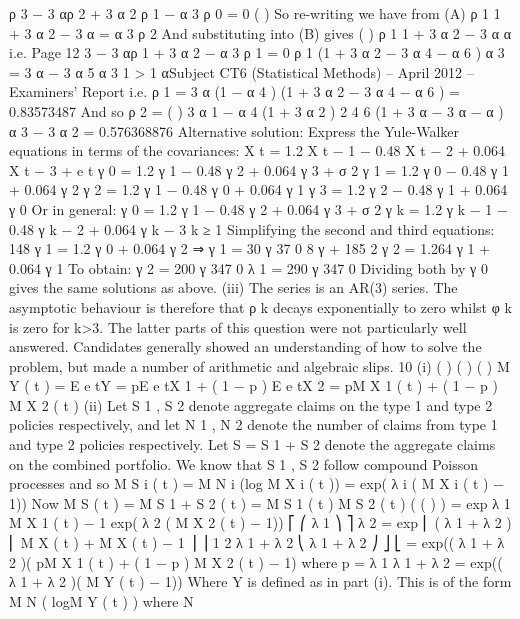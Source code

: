 \documentclass[a4paper,12pt]{article}
\begin{document}
ρ 3 − 3 αρ 2 + 3 α 2 ρ 1 − α 3 ρ 0 = 0
(
)
So re-writing we have from (A) ρ 1 1 + 3 α 2 − 3 α = α 3 ρ 2
And substituting into (B) gives
(
)
ρ 1 1 + 3 α 2 − 3 α
α
i.e.
Page 12
3
− 3 αρ 1 + 3 α 2 − α 3 ρ 1 = 0
ρ 1 (1 + 3 α 2 − 3 α 4 − α 6 )
α 3
=
3 α − 3 α 5
α 3
1
> 1
αSubject CT6 (Statistical Methods) – April 2012 – Examiners’ Report
i.e.
ρ 1 =
3 α (1 − α 4 )
(1 + 3 α 2 − 3 α 4 − α 6 )
= 0.83573487
And so
ρ 2 =
(
)
3 α 1 − α 4 (1 + 3 α 2 )
2
4
6
(1 + 3 α − 3 α − α ) α
3
−
3
α 2
= 0.576368876
Alternative solution:
Express the Yule-Walker equations in terms of the covariances:
X t = 1.2 X t − 1 − 0.48 X t − 2 + 0.064 X t − 3 + e t
γ 0 = 1.2 γ 1 − 0.48 γ 2 + 0.064 γ 3 + σ 2
γ 1 = 1.2 γ 0 − 0.48 γ 1 + 0.064 γ 2
γ 2 = 1.2 γ 1 − 0.48 γ 0 + 0.064 γ 1
γ 3 = 1.2 γ 2 − 0.48 γ 1 + 0.064 γ 0
Or in general:
γ 0 = 1.2 γ 1 − 0.48 γ 2 + 0.064 γ 3 + σ 2
γ k = 1.2 γ k − 1 − 0.48 γ k − 2 + 0.064 γ k − 3 k ≥ 1
Simplifying the second and third equations:
148 γ 1 = 1.2 γ 0 + 0.064 γ 2 ⇒ γ 1 =
30 γ
37 0
8 γ
+ 185
2
γ 2 = 1.264 γ 1 + 0.064 γ 1
To obtain:
γ 2 =
200 γ
347 0
λ 1 =
290 γ
347 0
Dividing both by γ 0 gives the same solutions as above.
(iii)
The series is an AR(3) series. The asymptotic behaviour is therefore that ρ k
decays exponentially to zero
whilst φ k is zero for k>3.
The latter parts of this question were not particularly well answered. Candidates generally
showed an understanding of how to solve the problem, but made a number of arithmetic and
algebraic slips.
\newpage
10
(i)
( )
( )
( )
M Y ( t ) = E e tY = pE e tX 1 + ( 1 − p ) E e tX 2
= pM X 1 ( t ) + ( 1 − p ) M X 2 ( t )
(ii)
Let S 1 , S 2 denote aggregate claims on the type 1 and type 2 policies
respectively, and let N 1 , N 2 denote the number of claims from type 1 and type
2 policies respectively. Let S = S 1 + S 2 denote the aggregate claims on the
combined portfolio. We know that S 1 , S 2 follow compound Poisson processes
and so
M S i ( t ) = M N i (log M X i ( t )) = exp( λ i ( M X i ( t ) − 1))
Now
M S ( t ) = M S 1 + S 2 ( t ) = M S 1 ( t ) M S 2 ( t )
( (
) )
= exp λ 1 M X 1 ( t ) − 1 exp( λ 2 ( M X 2 ( t ) − 1))
⎡
⎛ λ 1
⎞ ⎤
λ 2
= exp ⎢ ( λ 1 + λ 2 ) ⎜
M X ( t ) +
M X ( t ) − 1 ⎟ ⎥
1
2
λ 1 + λ 2
⎝ λ 1 + λ 2
⎠ ⎦
⎣
= exp(( λ 1 + λ 2 )( pM X 1 ( t ) + ( 1 − p ) M X 2 ( t ) − 1) where p =
λ 1
λ 1 + λ 2
= exp(( λ 1 + λ 2 )( M Y ( t ) − 1))
Where Y is defined as in part (i). This is of the form M N ( logM Y ( t ) ) where N
\end{document}
